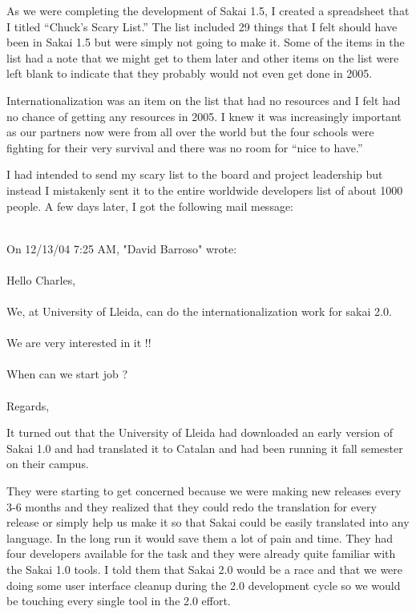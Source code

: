 \documentclass[12pt]{book}
\begin{document}
As we were completing the development of Sakai 1.5,
I created a
spreadsheet that I titled ``Chuck's Scary List.''
The list included 29 things that I felt should have been in
Sakai 1.5 but were simply not going to make it.
Some of the items in the
list had a note that we might get to them later
and other items on the list were left blank to
indicate that they probably would not even get
done in 2005.

Internationalization was an item on the list that
had no resources and I felt had no chance of getting
any resources in 2005.  I knew it was increasingly
important as our partners now were from all
over the world but the four schools were fighting
for their very survival and there was no room
for ``nice to have.''

I had intended to send my scary list to the board
and project leadership but instead I
mistakenly sent it to the entire worldwide developers
list of about 1000 people.  A few days later,
I got the following mail message:\\
\\
\begin{sf}
On 12/13/04 7:25 AM, "David Barroso" wrote:\\
\\
Hello Charles,\\
\\
We, at University of Lleida, can do the
internationalization work for sakai 2.0.\\
\\
We are very interested in it !!\\
\\
When can we start job ?\\
\\
Regards,\\
\end{sf}

It turned out that the University of Lleida had downloaded
an early version of Sakai 1.0 and had translated
it to Catalan and had been
running it fall semester on their campus.

They were starting to get concerned because we were making
new releases every 3-6 months and they realized that
they could redo the translation for every release or simply
help us make it so that Sakai could be easily translated
into any language.  In the long run it would save them a lot
of pain and time.
They had four developers available for the task and they were
already quite familiar with the Sakai 1.0 tools.  I told them
that Sakai 2.0 would be a race and that we were doing some
user interface cleanup during the 2.0 development cycle so
we would be touching every single tool in the 2.0 effort.
\end{document}
